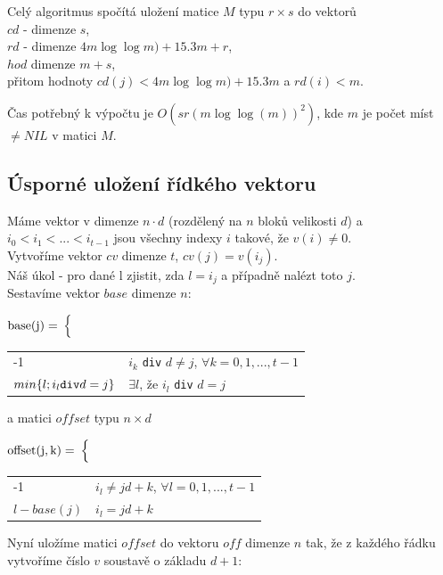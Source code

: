 Celý algoritmus spočítá uložení matice $M$ typu $r \times s$ do vektorů  \\
$cd$ - dimenze $s$, \\
$rd$ - dimenze $4m\log \log m) + 15.3m + r$, \\
$hod$ dimenze $m+s$, \\
přitom hodnoty $cd(j) < 4m\log \log m) + 15.3m$ a $rd(i) < m$.
\par
Čas potřebný k výpočtu je $O(sr(m \log \log(m))^2)$, kde $m$ je počet míst $\neq
NIL$ v matici $M$.


\subsection{Úsporné uložení řídkého vektoru}

Máme vektor v dimenze $n \cdot d$ (rozdělený na $n$ bloků velikosti $d$)
a $i_0 < i_1 < ... < i_{t-1}$ jsou všechny
indexy $i$ takové, že $v(i) \neq 0$. \\
Vytvoříme vektor $cv$ dimenze $t$, $cv(j)=v(i_j)$. \\
Náš úkol - pro dané l zjistit, zda $l = i_j$ a případně nalézt toto $j$. \\
Sestavíme vektor $base$ dimenze $n$:

\vspace{1mm}

${\rm base(j) = }$
$\Bigl\{$
\begin{tabular}{ll}
-1 & $i_k$ {\tt div} $d \neq j$, $\forall k=0,1,...,t-1$ \\
$min\{l; i_l {\tt div} d = j\}$ & $\exists l$, že $i_l$ {\tt div} $d = j$ \\
\end{tabular}

\vspace{1mm}

a matici $offset$ typu $n \times d$ 

\vspace{1mm}

${\rm offset(j,k) =}$
$\Bigl\{$
\begin{tabular}{ll}
-1 & $i_l \neq jd+k$, $\forall l = 0,1,...,t-1$ \\
$l-base(j)$ & $i_l = jd+k$ \\
\end{tabular}

\vspace{2mm}

Nyní uložíme matici $offset$ do vektoru $off$ dimenze $n$
tak, že z každého řádku vytvoříme číslo $v$ soustavě o základu $d+1$: \\

